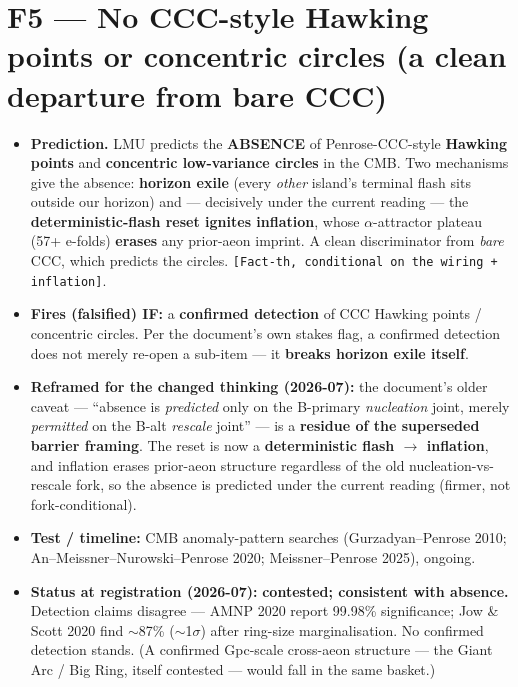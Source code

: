 \documentclass[11pt,a4paper]{article}
\newcommand{\st}[1]{\texttt{[#1]}}
\begin{document}
\section*{F5 --- No CCC-style Hawking points or concentric circles (a clean departure from bare CCC)}
\begin{itemize}
\item \textbf{Prediction.} LMU predicts the \textbf{ABSENCE} of Penrose-CCC-style \textbf{Hawking points} and \textbf{concentric low-variance circles} in the CMB. Two mechanisms give the absence: \textbf{horizon exile} (every \emph{other} island's terminal flash sits outside our horizon) and --- decisively under the current reading --- the \textbf{deterministic-flash reset ignites inflation}, whose $\alpha$-attractor plateau (57+ e-folds) \textbf{erases} any prior-aeon imprint. A clean discriminator from \emph{bare} CCC, which predicts the circles. \st{Fact-th, conditional on the wiring + inflation}.
\item \textbf{Fires (falsified) IF:} a \textbf{confirmed detection} of CCC Hawking points / concentric circles. Per the document's own stakes flag, a confirmed detection does not merely re-open a sub-item --- it \textbf{breaks horizon exile itself}.
\item \textbf{Reframed for the changed thinking (2026-07):} the document's older caveat --- ``absence is \emph{predicted} only on the B-primary \emph{nucleation} joint, merely \emph{permitted} on the B-alt \emph{rescale} joint'' --- is a \textbf{residue of the superseded barrier framing}. The reset is now a \textbf{deterministic flash $\to$ inflation}, and inflation erases prior-aeon structure regardless of the old nucleation-vs-rescale fork, so the absence is predicted under the current reading (firmer, not fork-conditional).
\item \textbf{Test / timeline:} CMB anomaly-pattern searches (Gurzadyan--Penrose 2010; An--Meissner--Nurowski--Penrose 2020; Meissner--Penrose 2025), ongoing.
\item \textbf{Status at registration (2026-07):} \textbf{contested; consistent with absence.} Detection claims disagree --- AMNP 2020 report 99.98\% significance; Jow \& Scott 2020 find $\sim$87\% ($\sim$1$\sigma$) after ring-size marginalisation. No confirmed detection stands. (A confirmed Gpc-scale cross-aeon structure --- the Giant Arc / Big Ring, itself contested --- would fall in the same basket.)
\end{itemize}
\end{document}
